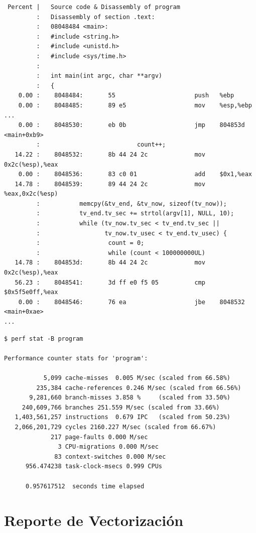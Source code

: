 \documentclass[a4paper]{report}
\begin{document}
\begin{lstlisting}
 Percent |   Source code & Disassembly of program
         :   Disassembly of section .text:
         :   08048484 <main>:
         :   #include <string.h>
         :   #include <unistd.h>
         :   #include <sys/time.h>
         :
         :   int main(int argc, char **argv)
         :   {
    0.00 :    8048484:       55                      push   %ebp
    0.00 :    8048485:       89 e5                   mov    %esp,%ebp
...
    0.00 :    8048530:       eb 0b                   jmp    804853d <main+0xb9>
         :                           count++;
   14.22 :    8048532:       8b 44 24 2c             mov    0x2c(%esp),%eax
    0.00 :    8048536:       83 c0 01                add    $0x1,%eax
   14.78 :    8048539:       89 44 24 2c             mov    %eax,0x2c(%esp)
         :           memcpy(&tv_end, &tv_now, sizeof(tv_now));
         :           tv_end.tv_sec += strtol(argv[1], NULL, 10);
         :           while (tv_now.tv_sec < tv_end.tv_sec ||
         :                  tv_now.tv_usec < tv_end.tv_usec) {
         :                   count = 0;
         :                   while (count < 100000000UL)
   14.78 :    804853d:       8b 44 24 2c             mov    0x2c(%esp),%eax
   56.23 :    8048541:       3d ff e0 f5 05          cmp    $0x5f5e0ff,%eax
    0.00 :    8048546:       76 ea                   jbe    8048532 <main+0xae>
...
\end{lstlisting}

\begin{lstlisting}
$ perf stat -B program

Performance counter stats for 'program':

           5,099 cache-misses  0.005 M/sec (scaled from 66.58%)
         235,384 cache-references 0.246 M/sec (scaled from 66.56%)
       9,281,660 branch-misses 3.858 %     (scaled from 33.50%)
     240,609,766 branches 251.559 M/sec (scaled from 33.66%)
   1,403,561,257 instructions  0.679 IPC   (scaled from 50.23%)
   2,066,201,729 cycles 2160.227 M/sec (scaled from 66.67%)
             217 page-faults 0.000 M/sec
               3 CPU-migrations 0.000 M/sec
              83 context-switches 0.000 M/sec
      956.474238 task-clock-msecs 0.999 CPUs

      0.957617512  seconds time elapsed
\end{lstlisting}

\section{Reporte de Vectorización}
\end{document}
